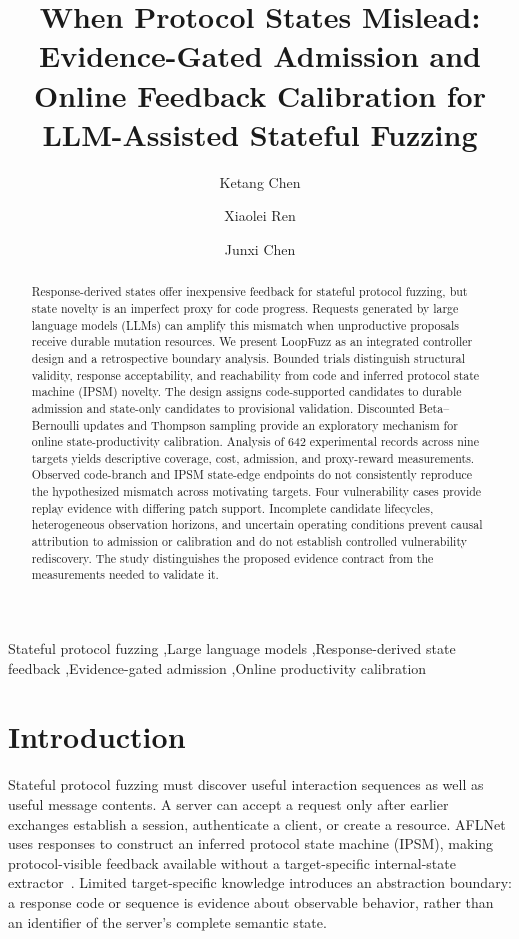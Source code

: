 \documentclass[final,5p,times,number]{elsarticle}
\begin{document}
\raggedbottom
\begin{frontmatter}
\title{When Protocol States Mislead: Evidence-Gated Admission and Online Feedback Calibration for LLM-Assisted Stateful Fuzzing}
\author[inst1]{Ketang Chen}
\author[inst1]{Xiaolei Ren}
\author[inst1]{Junxi Chen}
\begin{abstract}
Response-derived states offer inexpensive feedback for stateful protocol fuzzing, but state novelty is an imperfect proxy for code progress. Requests generated by large language models (LLMs) can amplify this mismatch when unproductive proposals receive durable mutation resources. We present LoopFuzz as an integrated controller design and a retrospective boundary analysis. Bounded trials distinguish structural validity, response acceptability, and reachability from code and inferred protocol state machine (IPSM) novelty. The design assigns code-supported candidates to durable admission and state-only candidates to provisional validation. Discounted Beta--Bernoulli updates and Thompson sampling provide an exploratory mechanism for online state-productivity calibration. Analysis of 642 experimental records across nine targets yields descriptive coverage, cost, admission, and proxy-reward measurements. Observed code-branch and IPSM state-edge endpoints do not consistently reproduce the hypothesized mismatch across motivating targets. Four vulnerability cases provide replay evidence with differing patch support. Incomplete candidate lifecycles, heterogeneous observation horizons, and uncertain operating conditions prevent causal attribution to admission or calibration and do not establish controlled vulnerability rediscovery. The study distinguishes the proposed evidence contract from the measurements needed to validate it.
\end{abstract}
\begin{keyword}
Stateful protocol fuzzing \sep Large language models \sep Response-derived state feedback \sep Evidence-gated admission \sep Online productivity calibration
\end{keyword}
\end{frontmatter}

\section{Introduction}
Stateful protocol fuzzing must discover useful interaction sequences as well as useful message contents. A server can accept a request only after earlier exchanges establish a session, authenticate a client, or create a resource. AFLNet uses responses to construct an inferred protocol state machine (IPSM), making protocol-visible feedback available without a target-specific internal-state extractor~\cite{aflnet}. Limited target-specific knowledge introduces an abstraction boundary: a response code or sequence is evidence about observable behavior, rather than an identifier of the server's complete semantic state.
\end{document}
